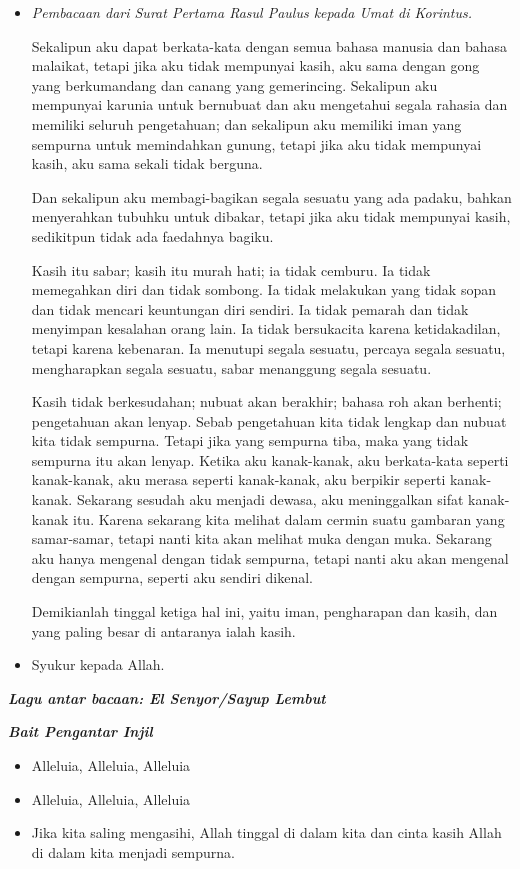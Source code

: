 \documentclass[12pt,two pages]{scrbook}
\makeatletter
\newcommand{\lagu}[1]{%
  {\parindent \z@ \normalfont
    \interlinepenalty\@M \bfseries \emph{#1}\par\nobreak \vskip 20\p@ }}
\newcommand{\BU}[1]{\begin{itemize} \item[U:] #1 \end{itemize}}
\newcommand{\BI}[1]{\begin{itemize} \item[I:] #1 \end{itemize}}
\newcommand{\BP}[1]{\begin{itemize} \item[P:] #1 \end{itemize}}
\makeatother
\begin{document}
\BP{\emph{Pembacaan dari Surat Pertama Rasul Paulus kepada Umat di Korintus.}

Sekalipun aku dapat berkata-kata dengan semua bahasa manusia dan bahasa malaikat, tetapi jika aku tidak mempunyai kasih, aku sama dengan gong yang berkumandang dan canang yang gemerincing.
Sekalipun aku mempunyai karunia untuk bernubuat dan aku mengetahui segala rahasia dan memiliki seluruh pengetahuan; dan sekalipun aku memiliki iman yang sempurna untuk memindahkan gunung, tetapi jika aku tidak mempunyai kasih, aku sama sekali tidak berguna.

Dan sekalipun aku membagi-bagikan segala sesuatu yang ada padaku, bahkan menyerahkan tubuhku untuk dibakar, tetapi jika aku tidak mempunyai kasih, sedikitpun tidak ada faedahnya bagiku.

Kasih itu sabar; kasih itu murah hati; ia tidak cemburu. Ia tidak memegahkan diri dan tidak sombong.
Ia tidak melakukan yang tidak sopan dan tidak mencari keuntungan diri sendiri. Ia tidak pemarah dan tidak menyimpan kesalahan orang lain.
Ia tidak bersukacita karena ketidakadilan, tetapi karena kebenaran.
Ia menutupi segala sesuatu, percaya segala sesuatu, mengharapkan segala sesuatu, sabar menanggung segala sesuatu.

Kasih tidak berkesudahan; nubuat akan berakhir; bahasa roh akan berhenti; pengetahuan akan lenyap.
Sebab pengetahuan kita tidak lengkap dan nubuat kita tidak sempurna.
Tetapi jika yang sempurna tiba, maka yang tidak sempurna itu akan lenyap.
Ketika aku kanak-kanak, aku berkata-kata seperti kanak-kanak, aku merasa seperti kanak-kanak, aku berpikir seperti kanak-kanak. Sekarang sesudah aku menjadi dewasa, aku meninggalkan sifat kanak-kanak itu.
Karena sekarang kita melihat dalam cermin suatu gambaran yang samar-samar, tetapi nanti kita akan melihat muka dengan muka. Sekarang aku hanya mengenal dengan tidak sempurna, tetapi nanti aku akan mengenal dengan sempurna, seperti aku sendiri dikenal.

Demikianlah tinggal ketiga hal ini, yaitu iman, pengharapan dan kasih, dan yang paling besar di antaranya ialah kasih.}
\BU{Syukur kepada Allah.}

\lagu{Lagu antar bacaan: El Senyor/Sayup Lembut}

\lagu{Bait Pengantar Injil}

\BI{Alleluia, Alleluia, Alleluia} 

\BU{Alleluia, Alleluia, Alleluia} 

\BI{Jika kita saling mengasihi, Allah tinggal di dalam kita dan cinta kasih Allah di dalam kita menjadi sempurna.} 
	
\end{document}
